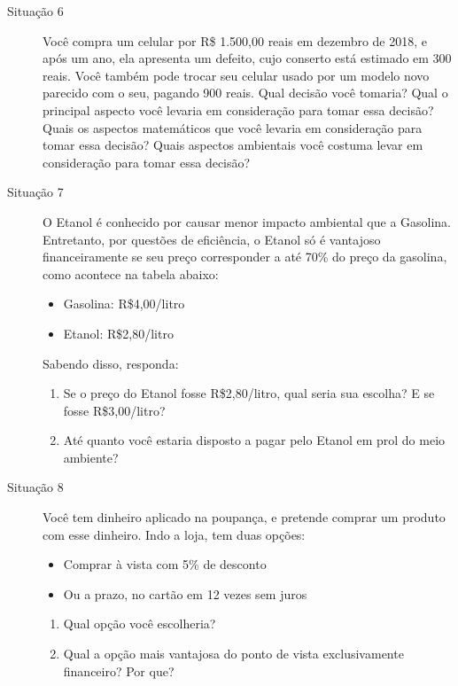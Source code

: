 \begin{description}
\item[{Situação 6}] \leavevmode{}\label{fin-def-6}
Você compra um celular por R\$ 1.500,00 reais em dezembro de 2018, e após um ano, ela apresenta um defeito, cujo conserto está estimado em 300 reais. Você também pode trocar seu celular usado por um modelo novo parecido com o seu, pagando 900 reais. Qual decisão você tomaria? Qual o principal aspecto você levaria em consideração para tomar essa decisão? Quais os aspectos matemáticos que você levaria em consideração para tomar essa decisão? Quais aspectos ambientais você costuma levar em consideração para tomar essa decisão?
\end{description}

\begin{description}
\item[{Situação 7}] \leavevmode{}\label{fin-def-7}
O Etanol é conhecido por causar menor impacto ambiental que a Gasolina. Entretanto, por questões de eficiência, o Etanol só é vantajoso financeiramente se seu preço corresponder a até 70\% do preço da gasolina, como acontece na tabela abaixo:


\begin{itemize}

\item Gasolina: R\$4,00/litro 
\item Etanol: R\$2,80/litro 

\end{itemize}

Sabendo disso, responda:

\begin{enumerate}
   \item Se o preço do Etanol fosse R\$2,80/litro, qual seria sua escolha? E se fosse R\$3,00/litro?
   \item Até quanto você estaria disposto a pagar pelo Etanol em prol do meio ambiente?
\end{enumerate}
\end{description}

\begin{description}
\item[{Situação 8}] \leavevmode{}\label{fin-def-8}

Você tem dinheiro aplicado na poupança, e pretende comprar um produto com esse dinheiro. Indo a loja, tem duas opções:
\begin{itemize}
\item Comprar à vista com 5\% de desconto
\item Ou a prazo, no cartão em 12 vezes sem juros
\end{itemize}

\begin{enumerate}
\item Qual opção você escolheria?
\item Qual a opção mais vantajosa do ponto de vista exclusivamente financeiro? Por que?
\end{enumerate}

\end{description}

